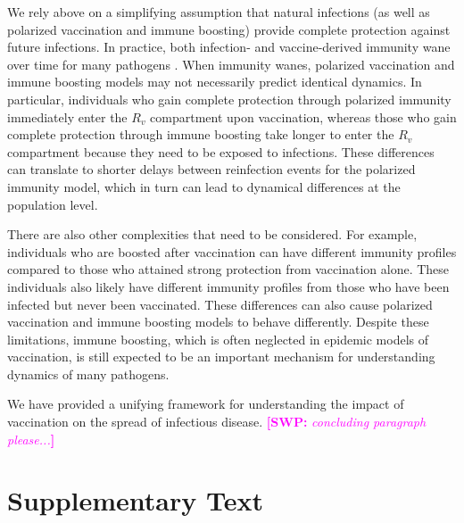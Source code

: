 \documentclass[12pt]{article}
\newcommand{\comment}{\showcomment}
\newcommand{\showcomment}[3]{\textcolor{#1}{\textbf{[#2: }\textsl{#3}\textbf{]}}}
\newcommand{\swp}[1]{\comment{magenta}{SWP}{#1}}
\begin{document}
We rely above on a simplifying assumption that natural infections (as well as polarized vaccination and immune boosting) provide complete protection against future infections.
In practice, both infection- and vaccine-derived immunity wane over time for many pathogens \citep{heffernan2009implications,lewnard2018vaccine,perez2022}.
When immunity wanes, polarized vaccination and immune boosting models may not necessarily predict identical dynamics.
In particular, individuals who gain complete protection through polarized immunity immediately enter the $R_v$ compartment upon vaccination, whereas those who gain complete protection through immune boosting take longer to enter the $R_v$ compartment because they need to be exposed to infections.
These differences can translate to shorter delays between reinfection events for the polarized immunity model, which in turn can lead to dynamical differences at the population level.

There are also other complexities that need to be considered.
For example, individuals who are boosted after vaccination can have different immunity profiles compared to those who attained strong protection from vaccination alone.
These individuals also likely have different immunity profiles from those who have been infected but never been vaccinated.
These differences can also cause polarized vaccination and immune boosting models to behave differently.
Despite these limitations, immune boosting, which is often neglected in epidemic models of vaccination, is still expected to be an important mechanism for understanding dynamics of many pathogens.

We have provided a unifying framework for understanding the impact of vaccination on the spread of infectious disease.
\swp{concluding paragraph please...}

\pagebreak

\section*{Supplementary Text}
\end{document}
